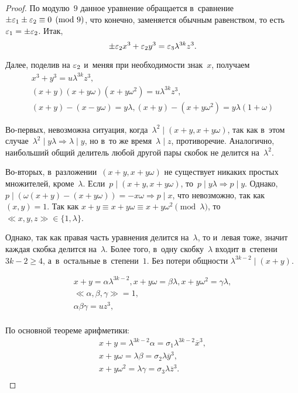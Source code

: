 \documentclass{article}
\begin{document}
\begin{proof}
  По модулю~$9$ данное уравнение обращается в~сравнение $\pm \varepsilon_1 \pm \varepsilon_2
  \equiv 0 \pmod 9$, что конечно, заменяется обычным равенством, то есть~$\varepsilon_1
  = \pm \varepsilon_2$. Итак,
  $$ \pm \varepsilon_2 x^3 + \varepsilon_2 y^3 = \varepsilon_3 \lambda^{3k} z^3.$$

  Далее, поделив на $\varepsilon_2$ и~меняя при необходимости знак~$x$, получаем
  \begin{gather*}
    x^3 + y^3 = u \lambda^{3k} z^3,\\
    (x + y)(x + y\omega)(x + y\omega^2) = u \lambda^{3k} z^3,\\
    (x + y) - (x - y\omega) = y \lambda, (x + y) - (x + y \omega^2) =
    y \lambda (1 + \omega)
  \end{gather*}

  Во-первых, невозможна ситуация, когда~$\lambda^2 \mid (x + y, x + y \omega)$,
  так как в~этом случае~$\lambda^2 \mid y\lambda \Rightarrow \lambda \mid y$,
  но в~то же время~$\lambda \mid z$, противоречие. Аналогично, наибольший общий
  делитель любой другой пары скобок не делится на~$\lambda^2$.

  Во-вторых, в~разложении~$(x + y, x + y \omega)$ не существует никаких простых
  множителей, кроме~$\lambda$. Если~$p \mid (x + y, x + y \omega)$,
  то~$p \mid y \lambda \Rightarrow p \mid y$. Однако, $p \mid (\omega(x + y) -
  (x + y \omega)) = -x \omega \Rightarrow p \mid x$, что невозможно, так
  как~$(x, y) = 1$. Так как $x + y \equiv x + y \omega \equiv x + y \omega^2
  \pmod \lambda$, то~$\ll\!x, y, z\!\gg \in \{1, \lambda \}$.

  Однако, так как правая часть уравнения делится на~$\lambda$, то и~левая тоже,
  значит каждая скобка делится на~$\lambda$. Более того, в~одну скобку~$\lambda$
  входит в~степени~$3k - 2 \ge 4$, а~в~остальные в~степени~$1$. Без потери
  общности $\lambda^{3k-2} \mid (x + y)$.

  \begin{gather*}
    x + y = \alpha \lambda^{3k-2}, x + y\omega = \beta \lambda,
    x + y\omega^2 = \gamma \lambda,\\
    \ll\! \alpha, \beta, \gamma \!\gg = 1,\\
    \alpha \beta \gamma = u z^3,\\
  \end{gather*}

  По основной теореме арифметики:
  \begin{gather*}
    x + y = \lambda^{3k-2} \alpha = \sigma_1 \lambda^{3k-2} \overline{x}^3,\\
    x + y\omega = \lambda \beta = \sigma_2 \lambda \overline{y}^3,\\
    x + y\omega^2 = \lambda \gamma = \sigma_3 \lambda \overline{z}^3.\\
  \end{gather*}


\end{proof}
\end{document}

